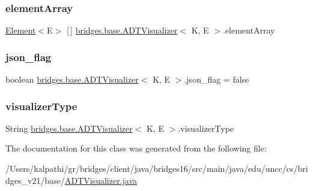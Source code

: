 \hypertarget{classbridges_1_1base_1_1_a_d_t_visualizer_a320739b4be463d3987b3de2463b0d592}{}\label{classbridges_1_1base_1_1_a_d_t_visualizer_a320739b4be463d3987b3de2463b0d592} 
\subsubsection{\texorpdfstring{element\+Array}{elementArray}}
{\footnotesize\ttfamily \hyperlink{classbridges_1_1base_1_1_element}{Element}$<$E$>$ \mbox{[}$\,$\mbox{]} \hyperlink{classbridges_1_1base_1_1_a_d_t_visualizer}{bridges.\+base.\+A\+D\+T\+Visualizer}$<$ K, E $>$.element\+Array}

\hypertarget{classbridges_1_1base_1_1_a_d_t_visualizer_abf75be63a37f31ada7f92a84bb1bc536}{}\label{classbridges_1_1base_1_1_a_d_t_visualizer_abf75be63a37f31ada7f92a84bb1bc536} 
\subsubsection{\texorpdfstring{json\+\_\+flag}{json\_flag}}
{\footnotesize\ttfamily boolean \hyperlink{classbridges_1_1base_1_1_a_d_t_visualizer}{bridges.\+base.\+A\+D\+T\+Visualizer}$<$ K, E $>$.json\+\_\+flag = false\hspace{0.3cm}{\ttfamily [protected]}}

\hypertarget{classbridges_1_1base_1_1_a_d_t_visualizer_a288aece657b5641f48e839b34f3884b9}{}\label{classbridges_1_1base_1_1_a_d_t_visualizer_a288aece657b5641f48e839b34f3884b9} 
\subsubsection{\texorpdfstring{visualizer\+Type}{visualizerType}}
{\footnotesize\ttfamily String \hyperlink{classbridges_1_1base_1_1_a_d_t_visualizer}{bridges.\+base.\+A\+D\+T\+Visualizer}$<$ K, E $>$.visualizer\+Type}



The documentation for this class was generated from the following file\+:\begin{DoxyCompactItemize}
\item 
/\+Users/kalpathi/gr/bridges/client/java/bridges16/src/main/java/edu/uncc/cs/bridges\+\_\+v21/base/\hyperlink{_a_d_t_visualizer_8java}{A\+D\+T\+Visualizer.\+java}\end{DoxyCompactItemize}

